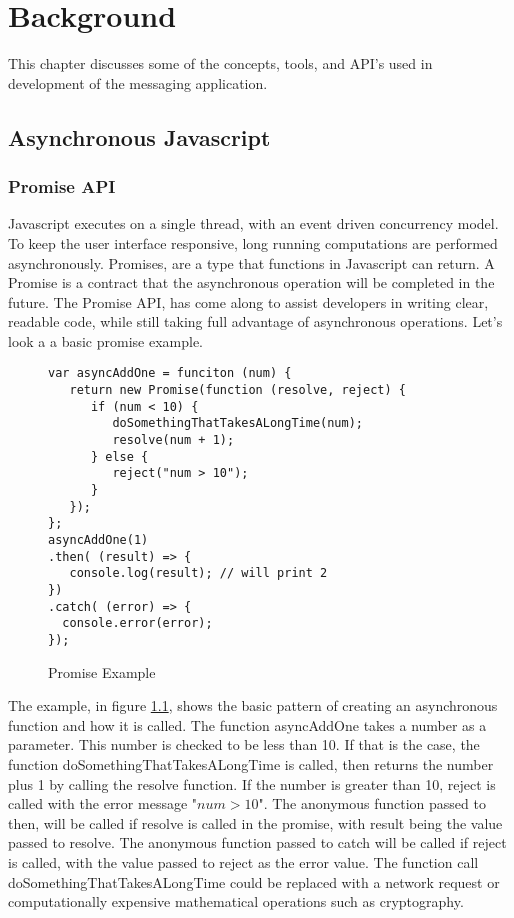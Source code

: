 \chapter{Background}


This chapter discusses some of the concepts, tools, and API's used in development of the messaging application.


\section{Asynchronous Javascript}


\subsection{Promise API}


Javascript executes on a single thread, with an event driven concurrency model. To keep the user interface responsive, long running computations are performed asynchronously. Promises, are a type that functions in Javascript can return. A Promise is a contract that the asynchronous operation will be completed in the future. The Promise API, has come along to assist developers in writing clear, readable code, while still taking full advantage of asynchronous operations. Let's look a a basic promise example.


\begin{figure}[!htbp]
\centering
\begin{lstlisting}[basicstyle=\small]
var asyncAddOne = funciton (num) {
   return new Promise(function (resolve, reject) {
      if (num < 10) {
         doSomethingThatTakesALongTime(num);
         resolve(num + 1);
      } else {
         reject("num > 10");
      }  
   }); 
}; 
asyncAddOne(1)
.then( (result) => {
   console.log(result); // will print 2
})
.catch( (error) => {
  console.error(error);
});
\end{lstlisting}
\caption{Promise Example}
\label{fig:promise}
\end{figure}


The example, in figure \ref{fig:promise}, shows the basic pattern of creating an asynchronous function and how it is called. The function asyncAddOne takes a number as a parameter. This number is checked to be less than 10. If that is the case, the function doSomethingThatTakesALongTime is called, then returns the number plus 1 by calling the resolve function. If the number is greater than 10, reject is called with the error message "$num > 10$". The anonymous function passed to then, will be called if resolve is called in the promise, with result being the value passed to resolve. The anonymous function passed to catch will be called if reject is called, with the value passed to reject as the error value. The function call doSomethingThatTakesALongTime could be replaced with a network request or computationally expensive mathematical operations such as cryptography.



